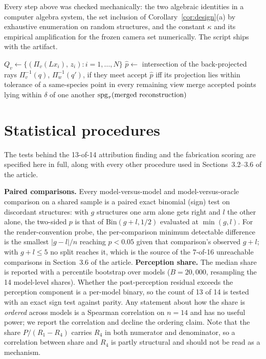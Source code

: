 Every step above was checked mechanically: the two algebraic identities in a computer algebra system, the
set inclusion of Corollary~\ref{cor:design}(a) by exhaustive enumeration on random structures, and the
constant $\kappa$ and its empirical amplification for the frozen camera set numerically. The script ships
with the artifact.

\begin{algorithm}[htbp]
\caption{Geometric oracle $O(s, \mathcal{C})$}
\label{alg:oracle}
\begin{algorithmic}[1]
  \State $Q_v \gets \{(\Pi_v(L x_i),\, z_i) : i = 1,\dots,N\}$
\EndFor
{}
  \State $\hat{p} \gets$ intersection of the back-projected rays $\Pi_v^{-1}(q)$, $\Pi_w^{-1}(q')$, if they meet
  \State accept $\hat{p}$ iff its projection lies within tolerance of a same-species point in every
         remaining view
\EndFor
\State merge accepted points lying within $\delta$ of one another
\State \Return $\mathrm{spg}_\tau(\text{merged reconstruction})$
\end{algorithmic}
\end{algorithm}

\section{Statistical procedures}
\label{app:stats}
The tests behind the 13-of-14 attribution finding and the fabrication scoring are specified here in full,
along with every other procedure used in Sections~3.2--3.6 of the article.

\textbf{Paired comparisons.} Every model-versus-model and model-versus-oracle comparison on a shared sample
is a paired exact binomial (sign) test on discordant structures: with $g$ structures one arm alone gets
right and $l$ the other alone, the two-sided $p$ is that of $\mathrm{Bin}(g+l, 1/2)$ evaluated at
$\min(g,l)$. For the render-convention probe, the per-comparison minimum detectable difference is the
smallest $|g-l|/n$ reaching $p<0.05$ given that comparison's observed $g+l$; with $g+l \le 5$ no split
reaches it, which is the source of the 7-of-16 unreachable comparisons in
Section~3.6 of the article.
\textbf{Perception share.} The median share is reported with a percentile bootstrap over models
($B = 20{,}000$, resampling the 14 model-level shares). Whether the post-perception residual exceeds the
perception component is a per-model binary, so the count of 13 of 14 is tested with an exact sign test
against parity. Any statement about how the share is \emph{ordered} across models is a Spearman
correlation on $n = 14$ and has no useful power; we report the correlation and decline the ordering claim.
Note that the share $P/(R_1 - R_4)$ carries $R_4$ in both numerator and denominator, so a correlation
between share and $R_4$ is partly structural and should not be read as a mechanism.

